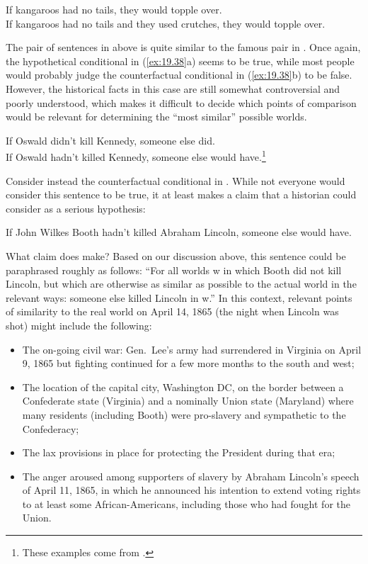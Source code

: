 \ea \label{ex:19.36}
\ea  If kangaroos had no tails, they would topple over.\\
\ex If kangaroos had no tails and they used crutches, they would topple over.
                       \z
\z



The pair of sentences in  above is quite similar to the famous pair in . Once again, the hypothetical conditional in (\ref{ex:19.38}a) seems to be true, while most people would probably judge the counterfactual conditional in (\ref{ex:19.38}b) to be false. However, the historical facts in this case are still somewhat controversial and poorly understood, which makes it difficult to decide which points of comparison would be relevant for determining the “most similar” possible worlds.


\ea \label{ex:19.38}
\ea  If Oswald didn’t kill Kennedy, someone else did. \\
\ex If Oswald hadn’t killed Kennedy, someone else would have.\footnote{These examples come from \citet{Adams1970}.}
                       \z
\z


Consider instead the counterfactual conditional in . While not everyone would consider this sentence to be true, it at least makes a claim that a historian could consider as a serious hypothesis:


\ea \label{ex:19.39}
If John Wilkes Booth hadn’t killed Abraham Lincoln, someone else would have.
\z


What claim does  make? Based on our discussion above, this sentence could be paraphrased roughly as follows: “For all worlds w in which Booth did not kill Lincoln, but which are otherwise as similar as possible to the actual world in the relevant ways: someone else killed Lincoln in w.” In this context, relevant points of similarity to the real world on April 14, 1865 (the night when Lincoln was shot) might include the following:

\begin{itemize}
\item The on-going civil war: Gen.~Lee’s army had surrendered in Virginia on April 9, 1865 but fighting continued for a few more months to the south and west;
\item The location of the capital city, Washington DC, on the border between a Confederate state (Virginia) and a nominally Union state (Maryland) where many residents (including Booth) were pro-slavery and sympathetic to the Confederacy;
\item The lax provisions in place for protecting the President during that era;
\item The anger aroused among supporters of slavery by Abraham Lincoln’s speech of April 11, 1865, in which he announced his intention to extend voting rights to at least some African-Americans, including those who had fought for the Union.
\end{itemize}

